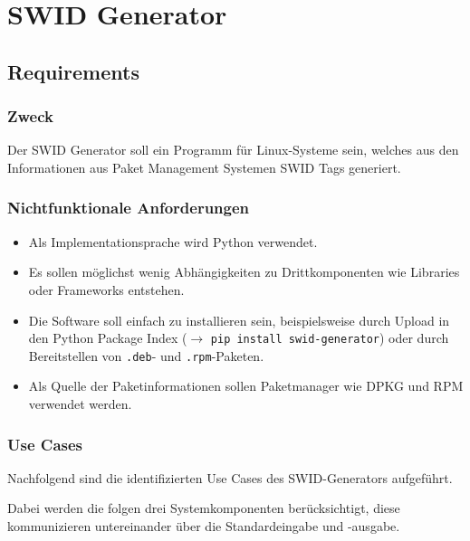 \chapter{SWID Generator}


\section{Requirements}

\subsection{Zweck}

Der SWID Generator soll ein Programm für Linux-Systeme sein, welches aus den
Informationen aus Paket Management Systemen SWID Tags generiert.

\subsection{Nichtfunktionale Anforderungen}

\begin{itemize}
	\item Als Implementationsprache wird Python verwendet.
	\item Es sollen möglichst wenig Abhängigkeiten zu Drittkomponenten wie
		Libraries oder Frameworks entstehen.
	\item Die Software soll einfach zu installieren sein, beispielsweise durch
		Upload in den Python Package Index ($\rightarrow$ \texttt{pip install
		swid-generator}) oder durch Bereitstellen von \texttt{.deb}- und
		\texttt{.rpm}-Paketen.
	\item Als Quelle der Paketinformationen sollen Paketmanager wie DPKG und RPM
		verwendet werden.
\end{itemize}

\subsection{Use Cases}

Nachfolgend sind die identifizierten Use Cases des SWID-Generators aufgeführt.

Dabei werden die folgen drei Systemkomponenten berücksichtigt, diese
kommunizieren untereinander über die Standardeingabe und -ausgabe.

\vspace{1em}

